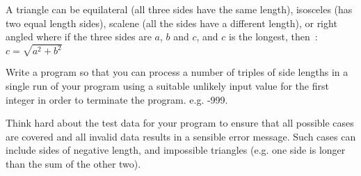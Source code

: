 
A triangle can be equilateral (all three sides have the same length),
isosceles (has two equal length sides), scalene
(all the sides have a different length), or
right angled where if the three sides are $a$, $b$ and $c$,
and $c$ is the longest, then~:
\begin{math}
c = \sqrt{a^2 + b^2}
\end{math}

\begin{exercise}
Write a program so that you can process a number of triples of side lengths
in a single run of your program using a suitable
unlikely input value for the first integer in order to terminate
the program. e.g. -999.

Think hard about the test data for your program to ensure that
all possible cases are covered and all invalid data results in
a sensible error message. Such cases can include sides of negative length,
and impossible triangles (e.g. one side is longer than the sum of the other two).
\end{exercise}

